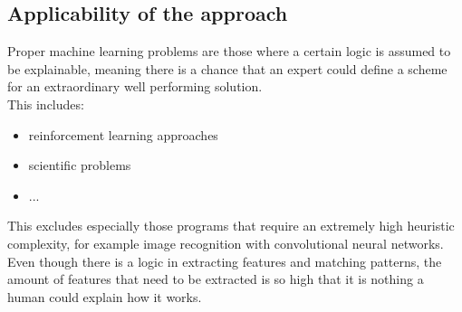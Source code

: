 \subsection{Applicability of the approach}

Proper machine learning problems are those where a certain logic is assumed to be explainable, meaning there is a chance that an expert could define a scheme for an extraordinary well performing solution.\\
This includes:
\begin{itemize}
    \item reinforcement learning approaches
    \item scientific problems
    \item ...
\end{itemize}

This excludes especially those programs that require an extremely high heuristic complexity, for example image recognition with convolutional neural networks. Even though there is a logic in extracting features and matching patterns, the amount of features that need to be extracted is so high that it is nothing a human could explain how it works.\\

